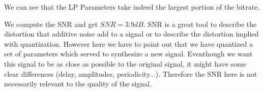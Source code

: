 We can see that the LP Parameters take indeed the largest portion of the bitrate.

We compute the SNR and get $SNR = 3.9 dB$. SNR is a great tool to describe the distortion that additive noise add to a signal or to describe
the distortion implied with quantization. However here we have to point out that we have quantized a set of parameters which served to synthesize
a new signal. Eventhough we want this signal to be as close as possible to the original signal, it might have some clear differences (delay, amplitudes,
periodicity...). Therefore the SNR here is not necessarily relevant to the quality of the signal.


